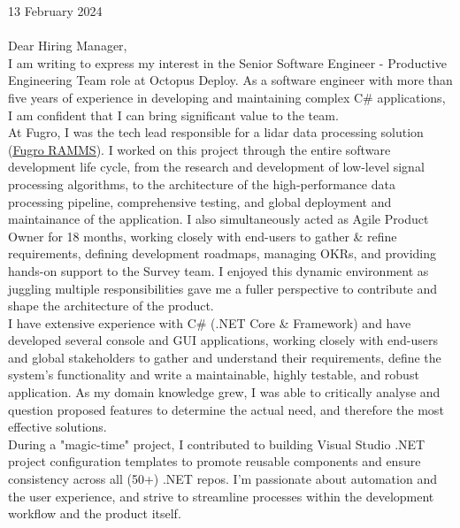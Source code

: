 \vspace{30pt}

13 February 2024 \\ \\

Dear Hiring Manager, \\

I am writing to express my interest in the Senior Software Engineer - Productive Engineering Team role at Octopus Deploy. As a software engineer with more than five years of experience in developing and maintaining complex C\# applications, I am confident that I can bring significant value to the team. \\

At Fugro, I was the tech lead responsible for a lidar data processing solution (\href{https://www.youtube.com/watch?v=f65bdm4tous}{\underline{Fugro RAMMS}}). I worked on this project through the entire software development life cycle, from the research and development of low-level signal processing algorithms, to the architecture of the high-performance data processing pipeline, comprehensive testing, and global deployment and maintainance of the application. I also simultaneously acted as Agile Product Owner for 18 months, working closely with end-users to gather \& refine requirements, defining development roadmaps, managing OKRs, and providing hands-on support to the Survey team. I enjoyed this dynamic environment as juggling multiple responsibilities gave me a fuller perspective to contribute and shape the architecture of the product. \\

I have extensive experience with C\# (.NET Core \& Framework) and have developed several console and GUI applications, working closely with end-users and global stakeholders to gather and understand their requirements, define the system's functionality and write a maintainable, highly testable, and robust application. As my domain knowledge grew, I was able to critically analyse and question proposed features to determine the actual need, and therefore the most effective solutions. \\

During a "magic-time" project, I contributed to building Visual Studio .NET project configuration templates to promote reusable components and ensure consistency across all (50+) .NET repos. I'm passionate about automation and the user experience, and strive to streamline processes within the development workflow and the product itself. \\

